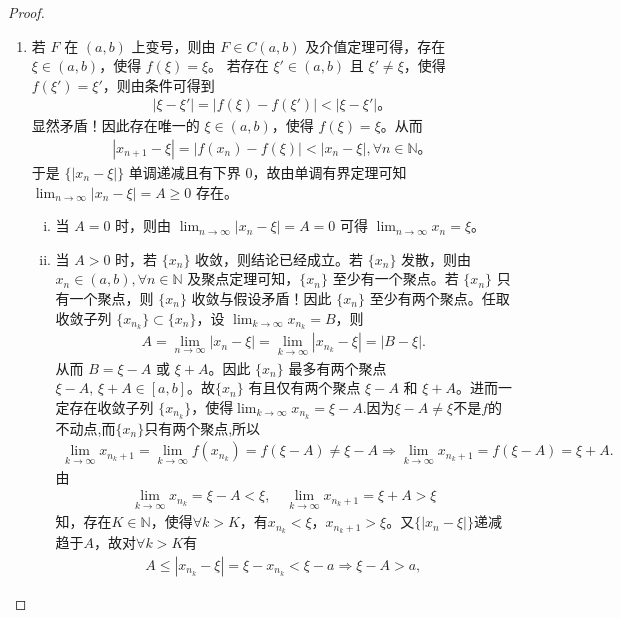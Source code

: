 \documentclass[../../main.tex]{subfiles}%
\begin{document}
\begin{proof}
\begin{enumerate}[(1)]
\item 若 $F$ 在 $(a, b)$ 上变号，则由 $F \in C(a, b)$ 及介值定理可得，存在 $\xi \in (a, b)$，使得 $f(\xi) = \xi$。
若存在 $\xi' \in (a, b)$ 且 $\xi' \neq \xi$，使得 $f(\xi') = \xi'$，则由条件可得到
\begin{align*}
|\xi - \xi'| = |f(\xi) - f(\xi')| < |\xi - \xi'|。
\end{align*}
显然矛盾！因此存在唯一的 $\xi \in (a, b)$，使得 $f(\xi) = \xi$。从而
\begin{align*}
|x_{n+1} - \xi| = |f(x_n) - f(\xi)| < |x_n - \xi|, \forall n \in \mathbb{N}。
\end{align*}
于是 $\{|x_n - \xi|\}$ 单调递减且有下界 $0$，故由单调有界定理可知 $\lim_{n \to \infty} |x_n - \xi| = A \geqslant 0$ 存在。
\begin{enumerate}[(i)]
\item 当 $A = 0$ 时，则由 $\lim_{n \to \infty} |x_n - \xi| = A = 0$ 可得 $\lim_{n \to \infty} x_n = \xi$。
\item 当 $A > 0$ 时，若 $\{x_n\}$ 收敛，则结论已经成立。若 $\{x_n\}$ 发散，则由 $x_n \in (a, b), \forall n \in \mathbb{N}$ 及聚点定理可知，$\{x_n\}$ 至少有一个聚点。若 $\{x_n\}$ 只有一个聚点，则 $\{x_n\}$ 收敛与假设矛盾！因此 $\{x_n\}$ 至少有两个聚点。任取收敛子列 $\{x_{n_k}\} \subset \{x_n\}$，设 $\lim_{k \to \infty} x_{n_k} = B$，则
\begin{align*}
A=\lim_{n\rightarrow \infty} |x_n-\xi |=\lim_{k\rightarrow \infty} |x_{n_k}-\xi |=|B-\xi |.
\end{align*}
从而 $B = \xi - A$ 或 $\xi + A$。因此 $\{x_n\}$ 最多有两个聚点 $\xi - A,\,\xi + A\in [a,b]$。故$\{x_n\}$ 有且仅有两个聚点 $\xi - A$ 和 $\xi + A$。进而一定存在收敛子列 $\{x_{n_k}\}$，使得$\lim_{k \to \infty} x_{n_k} = \xi - A.$因为$\xi-A\ne \xi$不是$f$的不动点,而$\{x_n\}$只有两个聚点,所以
\begin{align*}
\lim_{k\rightarrow \infty} x_{n_k+1}=\lim_{k\rightarrow \infty} f\left( x_{n_k} \right) =f\left( \xi -A \right) \ne \xi -A\Longrightarrow \lim_{k\rightarrow \infty} x_{n_k+1}=f(\xi -A)=\xi +A.
\end{align*}
由
\begin{align*}
\lim_{k\rightarrow \infty}x_{n_k}=\xi -A<\xi ,\quad \lim_{k\rightarrow \infty}x_{n_k+1}=\xi +A>\xi 
\end{align*}
知，存在$K\in \mathbb{N}$，使得$\forall k>K$，有$x_{n_k}<\xi$，$x_{n_k+1}>\xi$。又$\{| x_n-\xi |\}$递减趋于$A$，故对$\forall k>K$有
\begin{gather*}
A\leqslant | x_{n_k}-\xi |=\xi -x_{n_k}<\xi -a\Longrightarrow \xi -A>a,

\end{gather*}
\end{enumerate}
\end{enumerate}
\end{proof}
\end{document}
